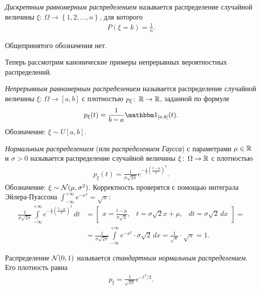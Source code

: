 \documentclass[../main.tex]{subfiles}
\begin{document}
\begin{exmpl}
 \textit{Дискретным равномерным распределением} называется распределение случайной величины $ \xi\colon\,\Omega\to \left\{ 1,2,\ldots,n \right\} $, для которого
 \begin{align*}
  P(\xi = k) = \frac{1}{n}.
 \end{align*}

Общепринятого обозначения нет.
\end{exmpl}

Теперь рассмотрим канонические примеры непрерывных вероятностных распределений.

\begin{exmpl}
 \textit{Непрерывным равномерным распределением} называется распределение случайной величины $ \xi\colon\,\Omega \to [a,b] $ с плотностью $ p_\xi \colon\,\mathbb{R}\to\mathbb{R} $, заданной по формуле
 \begin{align*}
  p_\xi(t) = \frac{1}{b-a}\Ind_{[a,b]}(t).
 \end{align*} Обозначение: $ \xi \sim U[a,b] $.
\end{exmpl}
\begin{exmpl}
 \textit{Нормальным распределением} (или \textit{распределением Гаусса}) с параметрами $ \mu \in \mathbb{R} $ и $ \sigma > 0 $ называется распределение случайной величины $ \xi \colon\,\Omega \to \mathbb{R} $ с плотностью
 \begin{align*}
  p_\xi(t) = \frac{1}{\sigma \sqrt{2\pi}}e^{-\frac{1}{2} \left( \frac{t-\mu}{\sigma} \right)^{2}}.
 \end{align*} Обозначение: $ \xi \sim \mathcal N(\mu,\sigma^{2}) $. Корректность проверятся с помощью интеграла Эйлера-Пуассона $ \int_{-\infty}^{+\infty}  e^{-x^{2}} = \sqrt \pi $:
 \begin{align*}
  \frac{1}{\sigma \sqrt{2\pi}} \int\limits_{-\infty}^{+\infty} e^{-\frac{1}{2} \left( \frac{t-\mu}{\sigma} \right)^{2}} \, dt &= \begin{bmatrix}
   x = \frac{t-\mu}{\sigma\sqrt{2}}, & t = \sigma \sqrt 2 x + \mu, & dt = \sigma \sqrt 2 \, dx
  \end{bmatrix} = \\
  &= \frac{1}{\sigma\sqrt{2\pi}} \int\limits_{-\infty}^{+\infty} e^{-x^{2}} \cdot \sigma\sqrt{2}\,dx = \frac{1}{\sqrt \pi} \cdot \sqrt\pi = 1.
 \end{align*} 

 Распределение $ \mathcal N(0,1) $ называется \textit{стандартным нормальным распределением}. Его плотность равна
 \begin{align*}
  p_\xi = \frac{1}{\sqrt{2\pi}}e^{-t^{2} / 2}.
 \end{align*} 
\end{exmpl}
\end{document}

